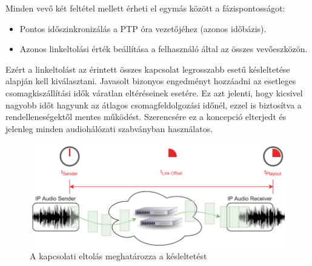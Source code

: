 Minden vevő két feltétel mellett érheti el egymás között a fázispontosságot:
\begin{itemize}
	\item Pontos időszinkronizálás a PTP óra vezetőjéhez (azonos időbázis).
	\item Azonos linkeltolási érték beállítása a felhasználó által az összes vevőeszközön.
\end{itemize}
Ezért a linkeltolást az érintett összes kapcsolat legrosszabb esetű késleltetése alapján kell kiválasztani. 
Javasolt bizonyos engedményt hozzáadni az esetleges csomagkiszállítási idők váratlan eltéréseinek esetére.
Ez azt jelenti, hogy kicsivel nagyobb időt hagyunk az átlagos csomagfeldolgozási időnél, 
ezzel is biztosítva a rendelleneségektől mentes működést.
Szerencsére ez a koncepció elterjedt és jelenleg minden audiohálózati szabványban használatos. 
\begin{figure}[H]
	\centering
	\includegraphics[width=\linewidth, keepaspectratio]{figures/link_offset_latency.png}
	\caption{A kapcsolati eltolás meghatározza a késleltetést~\cite{AHNERT2023}}
	\label {fig:link_offset_latency}
\end{figure}

